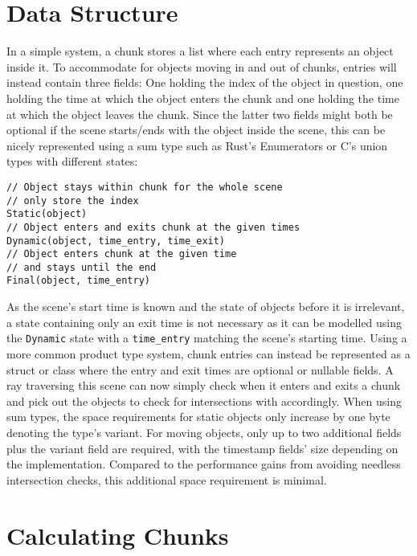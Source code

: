 \section{Data Structure}

In a simple system, a chunk stores a list where each entry represents an object inside it.
To accommodate for objects moving in and out of chunks, entries will instead contain three fields:
One holding the index of the object in question,
one holding the time at which the object enters the chunk
and one holding the time at which the object leaves the chunk.
Since the latter two fields might both be optional if the scene starts/ends with the object inside the scene,
this can be nicely represented using a sum type such as Rust's Enumerators or C's union types with different states:

\begin{verbatim}
// Object stays within chunk for the whole scene
// only store the index
Static(object)
// Object enters and exits chunk at the given times
Dynamic(object, time_entry, time_exit)
// Object enters chunk at the given time
// and stays until the end
Final(object, time_entry)
\end{verbatim}

As the scene's start time is known and the state of objects before it is irrelevant,
a state containing only an exit time is not necessary as it can be modelled using the
\verb|Dynamic| state with a \verb|time_entry| matching the scene's starting time.
Using a more common product type system, chunk entries can instead be represented as a
struct or class where the entry and exit times are optional or nullable fields.
\newline
A ray traversing this scene can now simply check when it enters and exits a chunk
and pick out the objects to check for intersections with accordingly.
When using sum types, the space requirements for static objects only increase by one byte denoting the type's variant.
For moving objects, only up to two additional fields plus the variant field are required,
with the timestamp fields' size depending on the implementation.
Compared to the performance gains from avoiding needless intersection checks,
this additional space requirement is minimal.

\section{Calculating Chunks}


